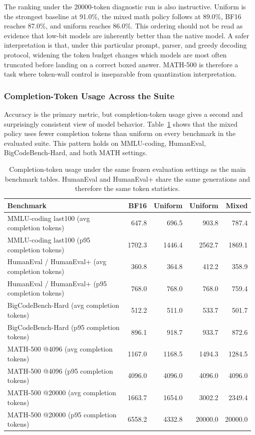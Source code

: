 The ranking under the 20000-token diagnostic run is also instructive. Uniform \inteight{} is the strongest baseline at 91.0\%, the mixed math policy follows at 89.0\%, BF16 reaches 87.0\%, and uniform \intfour{} reaches 86.0\%. This ordering should not be read as evidence that low-bit models are inherently better than the native model. A safer interpretation is that, under this particular prompt, parser, and greedy decoding protocol, widening the token budget changes which models are most often truncated before landing on a correct boxed answer. MATH-500 is therefore a task where token-wall control is inseparable from quantization interpretation.

\subsubsection{Completion-Token Usage Across the Suite}

Accuracy is the primary metric, but completion-token usage gives a second and surprisingly consistent view of model behavior. Table~\ref{tab:results-token-summary} shows that the mixed policy uses fewer completion tokens than uniform \intfour{} on every benchmark in the evaluated suite. This pattern holds on MMLU-coding, HumanEval, BigCodeBench-Hard, and both MATH settings.

\begin{table}[t]
\centering
\caption{Completion-token usage under the same frozen evaluation settings as the main benchmark tables. HumanEval and HumanEval+ share the same generations and therefore the same token statistics.}
\label{tab:results-token-summary}
\footnotesize
\begin{tabular}{lrrrr}
\toprule
Benchmark & BF16 & Uniform \inteight{} & Uniform \intfour{} & Mixed \\
\midrule
MMLU-coding last100 (avg completion tokens) & 647.8 & 696.5 & 903.8 & 787.4 \\
MMLU-coding last100 (p95 completion tokens) & 1702.3 & 1446.4 & 2562.7 & 1869.1 \\
\midrule
HumanEval / HumanEval+ (avg completion tokens) & 360.8 & 364.8 & 412.2 & 358.9 \\
HumanEval / HumanEval+ (p95 completion tokens) & 768.0 & 768.0 & 768.0 & 759.4 \\
\midrule
BigCodeBench-Hard (avg completion tokens) & 512.2 & 511.0 & 533.7 & 501.7 \\
BigCodeBench-Hard (p95 completion tokens) & 896.1 & 918.7 & 933.7 & 872.6 \\
\midrule
MATH-500 @4096 (avg completion tokens) & 1167.0 & 1168.5 & 1494.3 & 1284.5 \\
MATH-500 @4096 (p95 completion tokens) & 4096.0 & 4096.0 & 4096.0 & 4096.0 \\
\midrule
MATH-500 @20000 (avg completion tokens) & 1663.7 & 1654.0 & 3002.2 & 2349.4 \\
MATH-500 @20000 (p95 completion tokens) & 6558.2 & 4332.8 & 20000.0 & 20000.0 \\
\bottomrule
\end{tabular}
\end{table}

